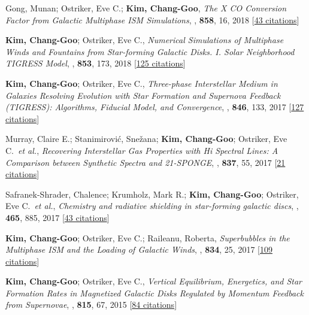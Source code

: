 \item[{15.}]Gong, Munan; Ostriker, Eve C.; \textbf{Kim, Chang-Goo}, \textit{The X CO Conversion Factor from Galactic Multiphase ISM Simulations}, , \textbf{858}, 16, 2018 [\href{http://adsabs.harvard.edu/abs/2018ApJ...858...16G}{43 citations}]

\item[{14.}]\textbf{Kim, Chang-Goo}; Ostriker, Eve C., \textit{Numerical Simulations of Multiphase Winds and Fountains from Star-forming Galactic Disks. I. Solar Neighborhood TIGRESS Model}, , \textbf{853}, 173, 2018 [\href{http://adsabs.harvard.edu/abs/2018ApJ...853..173K}{125 citations}]

\item[{13.}]\textbf{Kim, Chang-Goo}; Ostriker, Eve C., \textit{Three-phase Interstellar Medium in Galaxies Resolving Evolution with Star Formation and Supernova Feedback (TIGRESS): Algorithms, Fiducial Model, and Convergence}, , \textbf{846}, 133, 2017 [\href{http://adsabs.harvard.edu/abs/2017ApJ...846..133K}{127 citations}]

\item[{12.}]Murray, Claire E.; Stanimirovi{\'c}, Sne{\v{z}}ana; \textbf{Kim, Chang-Goo}; Ostriker, Eve C.~\textit{et al.}, \textit{Recovering Interstellar Gas Properties with Hi Spectral Lines: A Comparison between Synthetic Spectra and 21-SPONGE}, , \textbf{837}, 55, 2017 [\href{http://adsabs.harvard.edu/abs/2017ApJ...837...55M}{21 citations}]

\item[{11.}]Safranek-Shrader, Chalence; Krumholz, Mark R.; \textbf{Kim, Chang-Goo}; Ostriker, Eve C.~\textit{et al.}, \textit{Chemistry and radiative shielding in star-forming galactic discs}, , \textbf{465}, 885, 2017 [\href{http://adsabs.harvard.edu/abs/2017MNRAS.465..885S}{43 citations}]

\item[{10.}]\textbf{Kim, Chang-Goo}; Ostriker, Eve C.; Raileanu, Roberta, \textit{Superbubbles in the Multiphase ISM and the Loading of Galactic Winds}, , \textbf{834}, 25, 2017 [\href{http://adsabs.harvard.edu/abs/2017ApJ...834...25K}{109 citations}]

\item[{9.}]\textbf{Kim, Chang-Goo}; Ostriker, Eve C., \textit{Vertical Equilibrium, Energetics, and Star Formation Rates in Magnetized Galactic Disks Regulated by Momentum Feedback from Supernovae}, , \textbf{815}, 67, 2015 [\href{http://adsabs.harvard.edu/abs/2015ApJ...815...67K}{84 citations}]


